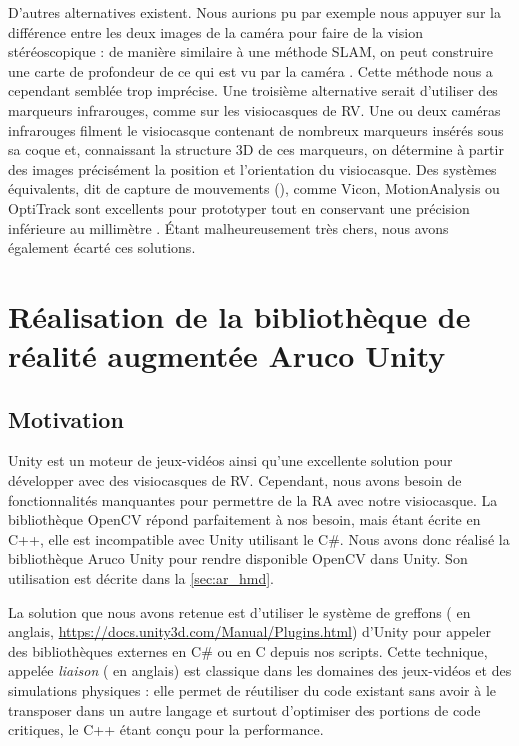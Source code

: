 
D'autres alternatives existent. Nous aurions pu par exemple nous appuyer sur la différence entre les deux images de la caméra pour faire de la vision stéréoscopique : de manière similaire à une méthode SLAM, on peut construire une carte de profondeur de ce qui est vu par la caméra . Cette méthode nous a cependant semblée trop imprécise. Une troisième alternative serait d'utiliser des marqueurs infrarouges, comme sur les visiocasques de RV. Une ou deux caméras infrarouges filment le visiocasque contenant de nombreux marqueurs insérés sous sa coque  et, connaissant la structure 3D de ces marqueurs, on détermine à partir des images précisément la position et l'orientation du visiocasque. Des systèmes équivalents, dit de capture de mouvements (), comme Vicon, MotionAnalysis ou OptiTrack sont excellents pour prototyper tout en conservant une précision inférieure au millimètre . Étant malheureusement très chers, nous avons également écarté ces solutions.


\section{Réalisation de la bibliothèque de réalité augmentée Aruco Unity}
\label{sec:aruco_unity}

\subsection{Motivation}
\label{subsec:aruco_unity_motivation}
Unity est un moteur de jeux-vidéos ainsi qu'une excellente solution pour développer avec des visiocasques de RV. Cependant, nous avons besoin de fonctionnalités manquantes pour permettre de la RA avec notre visiocasque. La bibliothèque OpenCV répond parfaitement à nos besoin, mais étant écrite en C++, elle est incompatible avec Unity utilisant le C\#. Nous avons donc réalisé la bibliothèque Aruco Unity pour rendre disponible OpenCV dans Unity. Son utilisation est décrite dans la \autoref{sec:ar_hmd}.

La solution que nous avons retenue est d'utiliser le système de greffons ( en anglais, \url{https://docs.unity3d.com/Manual/Plugins.html}) d'Unity pour appeler des bibliothèques externes en C\# ou en C depuis nos scripts. Cette technique, appelée \emph{liaison} ( en anglais) est classique dans les domaines des jeux-vidéos et des simulations physiques : elle permet de réutiliser du code existant sans avoir à le transposer dans un autre langage et surtout d'optimiser des portions de code critiques, le C++ étant conçu pour la performance.

